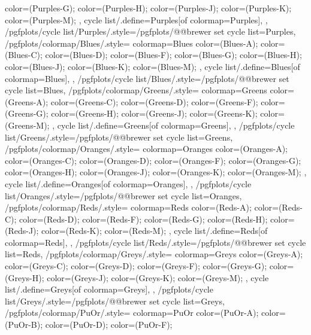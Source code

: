 {{{      color=(Purples-G);
      color=(Purples-H);
      color=(Purples-J);
      color=(Purples-K);
      color=(Purples-M);
    },
    cycle list/.define={Purples}{[of colormap=Purples]},
  },
  /pgfplots/cycle list/Purples/.style={/pgfplots/@@brewer set cycle list={Purples}},
  /pgfplots/colormap/Blues/.style={
    colormap={Blues}{
      color=(Blues-A);
      color=(Blues-C);
      color=(Blues-D);
      color=(Blues-F);
      color=(Blues-G);
      color=(Blues-H);
      color=(Blues-J);
      color=(Blues-K);
      color=(Blues-M);
    },
    cycle list/.define={Blues}{[of colormap=Blues]},
  },
  /pgfplots/cycle list/Blues/.style={/pgfplots/@@brewer set cycle list={Blues}},
  /pgfplots/colormap/Greens/.style={
    colormap={Greens}{
      color=(Greens-A);
      color=(Greens-C);
      color=(Greens-D);
      color=(Greens-F);
      color=(Greens-G);
      color=(Greens-H);
      color=(Greens-J);
      color=(Greens-K);
      color=(Greens-M);
    },
    cycle list/.define={Greens}{[of colormap=Greens]},
  },
  /pgfplots/cycle list/Greens/.style={/pgfplots/@@brewer set cycle list={Greens}},
  /pgfplots/colormap/Oranges/.style={
    colormap={Oranges}{
      color=(Oranges-A);
      color=(Oranges-C);
      color=(Oranges-D);
      color=(Oranges-F);
      color=(Oranges-G);
      color=(Oranges-H);
      color=(Oranges-J);
      color=(Oranges-K);
      color=(Oranges-M);
    },
    cycle list/.define={Oranges}{[of colormap=Oranges]},
  },
  /pgfplots/cycle list/Oranges/.style={/pgfplots/@@brewer set cycle list={Oranges}},
  /pgfplots/colormap/Reds/.style={
    colormap={Reds}{
      color=(Reds-A);
      color=(Reds-C);
      color=(Reds-D);
      color=(Reds-F);
      color=(Reds-G);
      color=(Reds-H);
      color=(Reds-J);
      color=(Reds-K);
      color=(Reds-M);
    },
    cycle list/.define={Reds}{[of colormap=Reds]},
  },
  /pgfplots/cycle list/Reds/.style={/pgfplots/@@brewer set cycle list={Reds}},
  /pgfplots/colormap/Greys/.style={
    colormap={Greys}{
      color=(Greys-A);
      color=(Greys-C);
      color=(Greys-D);
      color=(Greys-F);
      color=(Greys-G);
      color=(Greys-H);
      color=(Greys-J);
      color=(Greys-K);
      color=(Greys-M);
    },
    cycle list/.define={Greys}{[of colormap=Greys]},
  },
  /pgfplots/cycle list/Greys/.style={/pgfplots/@@brewer set cycle list={Greys}},
  /pgfplots/colormap/PuOr/.style={
    colormap={PuOr}{
      color=(PuOr-A);
      color=(PuOr-B);
      color=(PuOr-D);
      color=(PuOr-F);
}}}
